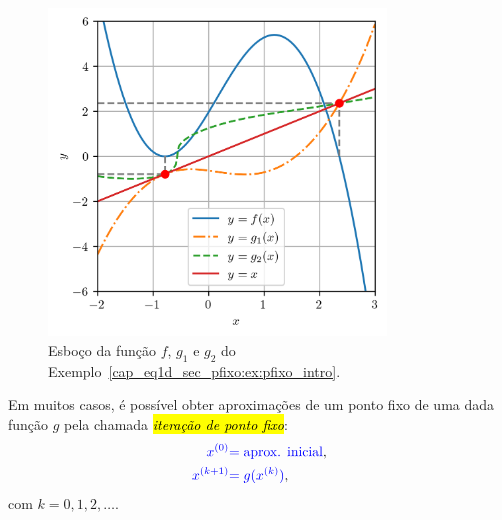 \begin{ex}
\begin{figure}[H]
  \centering
  \includegraphics[width=0.8\textwidth]{./cap_eq1d/dados/fig_ex_pfixo_intro/fig}
  \caption{Esboço da função $f$, $g_1$ e $g_2$ do Exemplo~\ref{cap_eq1d_sec_pfixo:ex:pfixo_intro}.}
  \label{cap_eq1d_sec_pfixo:fig:ex_pfixo_intro}
\end{figure}
\end{ex}

Em muitos casos, é possível obter aproximações de um ponto fixo de uma dada função $g$ pela chamada \hl{\emph{iteração de ponto fixo}}:
\begin{align}
  {\color{blue}x^{(0)}} &{\color{blue}= \text{aprox. inicial}},\\
  {\color{blue}x^{(k+1)}} &{\color{blue}= g(x^{(k)})},
\end{align}
com $k=0,1,2,\ldots$.

